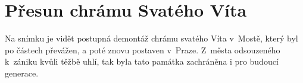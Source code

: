 
\chapter{Přesun chrámu Svatého Víta}

Na snímku je vidět postupná demontáž chrámu svatého Víta v~Mostě, který byl po
částech převážen, a poté znovu postaven v~Praze. Z~města odsouzeného k~zániku
kvůli těžbě uhlí, tak byla tato památka zachráněna i pro budoucí generace.

